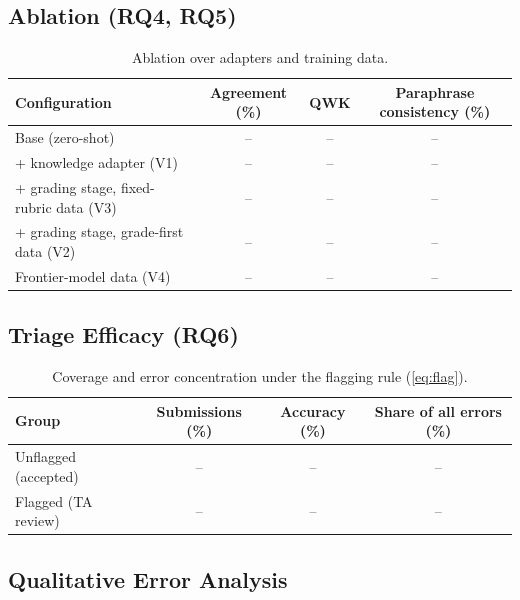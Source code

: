 \documentclass[11pt,a4paper]{article}
\newif\ifdraft
\newcommand{\todo}[2]{%
  \ifdraft\textcolor{red}{\textbf{[TODO #1:} #2\textbf{]}}\fi}
\newcommand{\ph}[1]{\ifdraft\textcolor{blue!70!black}{#1}\else #1\fi}
\theoremstyle{definition}
\begin{document}
\subsection{Ablation (RQ4, RQ5)}\label{sec:res_rq4}
\begin{table}[t]
\centering
\caption{Ablation over adapters and training data.}
\label{tab:rq4}
\small
\begin{tabular}{lccc}
\toprule
Configuration & Agreement (\%) & QWK & Paraphrase consistency (\%)\\
\midrule
Base (zero-shot) & \ph{--} & \ph{--} & \ph{--}\\
+ knowledge adapter (V1) & \ph{--} & \ph{--} & \ph{--}\\
+ grading stage, fixed-rubric data (V3) & \ph{--} & \ph{--} & \ph{--}\\
+ grading stage, grade-first data (V2) & \ph{--} & \ph{--} & \ph{--}\\
Frontier-model data (V4) & \ph{--} & \ph{--} & \ph{--}\\
\bottomrule
\end{tabular}
\end{table}

\subsection{Triage Efficacy (RQ6)}\label{sec:res_triage}
\begin{table}[t]
\centering
\caption{Coverage and error concentration under the flagging rule (\cref{eq:flag}).}
\label{tab:rq_triage}
\small
\begin{tabular}{lccc}
\toprule
Group & Submissions (\%) & Accuracy (\%) & Share of all errors (\%)\\
\midrule
Unflagged (accepted) & \ph{--} & \ph{--} & \ph{--}\\
Flagged (TA review) & \ph{--} & \ph{--} & \ph{--}\\
\bottomrule
\end{tabular}
\end{table}

\subsection{Qualitative Error Analysis}
\todo{}{Pull 3--5 concrete model failures from the evaluation runs (\cref{app:examples}). Suggested categories: algebra errors hidden by fluent prose; base-case edge cases; over-penalising unconventional but valid reasoning; reasons that contradict the level; following embedded instructions.}
\end{document}
